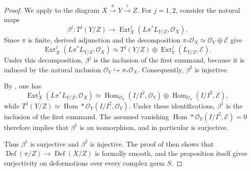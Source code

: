 \documentclass[11pt,twoside]{amsart}
\theoremstyle{plain}
\numberwithin{equation}{section}
\theoremstyle{definition}
\begin{document}
\begin{proof}
We apply \cite[Proposition~1.10]{Wehler1986} to the diagram
$
X\xrightarrow{\pi}Y\xrightarrow{i}Z.
$
For $j=1,2$, consider the natural maps
$$
\beta^j:T^j(Y/Z)\longrightarrow
\operatorname{Ext}^j_X(L\pi^*L_{Y/Z},\mathcal O_X).
$$
Since $\pi$ is finite, derived adjunction and the decomposition
$
\pi_*\mathcal O_X\simeq\mathcal O_Y\oplus\mathcal E
$
give
$$
\operatorname{Ext}^j_X(L\pi^*L_{Y/Z},\mathcal O_X)
\simeq
T^j(Y/Z)\oplus
\operatorname{Ext}^j_Y(L_{Y/Z},\mathcal E).
$$
Under this decomposition, $\beta^j$ is the inclusion of the first summand, because it is induced by the natural inclusion
$
\mathcal O_Y\hookrightarrow\pi_*\mathcal O_X.
$
Consequently, $\beta^2$ is injective.

By , one has
$$
\operatorname{Ext}^1_X(L\pi^*L_{Y/Z},\mathcal O_X)
\simeq
\operatorname{Hom}_{\mathcal O_Y}(I/I^2,\mathcal O_Y)
\oplus
\operatorname{Hom}_{\mathcal O_Y}(I/I^2,\mathcal E),
$$
while
$
T^1(Y/Z)\simeq\operatorname{Hom}*{\mathcal O_Y}(I/I^2,\mathcal O_Y).
$
Under these identifications, $\beta^1$ is the inclusion of the first summand. The assumed vanishing
$
\operatorname{Hom}*{\mathcal O_Y}(I/I^2,\mathcal E)=0
$
therefore implies that $\beta^1$ is an isomorphism, and in particular is surjective.

Thus $\beta^1$ is surjective and $\beta^2$ is injective. The proof of \cite[Proposition~1.10]{Wehler1986} then shows that
$
\operatorname{Def}(\pi/Z)\to\operatorname{Def}(X/Z)
$
is formally smooth, and the proposition itself gives surjectivity on deformations over every complex germ $S$.
\end{proof}
\end{document}
